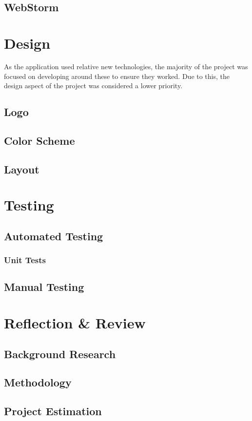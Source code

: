 \documentclass[]{report}
\begin{document}
		\section{WebStorm}
		
	\chapter{Design}
		As the application used relative new technologies, the majority of the project was focused on developing around these to ensure they worked. Due to this, the design aspect of the project was considered a lower priority.
		\section{Logo}
		\section{Color Scheme}
		\section{Layout}

	\chapter{Testing}
		\section{Automated Testing}
			\subsection{Unit Tests}
		\section{Manual Testing}
	
	\chapter{Reflection \& Review}
		\section{Background Research}
		\section{Methodology}
		\section{Project Estimation}
\end{document}
